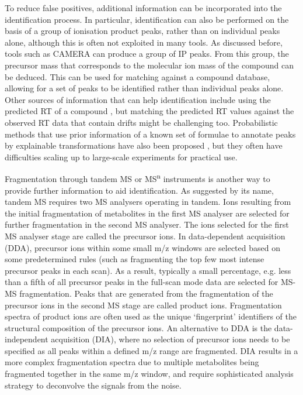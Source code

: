 To reduce false positives, additional information can be incorporated into the identification process. In particular, identification can also be performed on the basis of a group of ionisation product peaks, rather than on individual peaks alone, although this is often not exploited in many tools. As discussed before, tools such as CAMERA \cite{Kuhl2012} can produce a group of IP peaks. From this group, the precursor mass that corresponds to the molecular ion mass of the compound can be deduced. This can be used for matching against a compound database, allowing for a set of peaks to be identified rather than individual peaks alone. Other sources of information that can help identification include using the predicted RT of a compound \cite{Creek2011, Cao2015, Stanstrup2015}, but matching the predicted RT values against the observed RT data that contain drifts might be challenging too. Probabilistic methods that use prior information of a known set of formulae to annotate peaks by explainable transformations have also been proposed \cite{Rogers2009a, Daly2014}, but they often have difficulties scaling up to large-scale experiments for practical use.

Fragmentation through tandem MS or MS\textsuperscript{n} instruments is another way to provide further information to aid identification. As suggested by its name, tandem MS requires two MS analysers operating in tandem. Ions resulting from the initial fragmentation of metabolites in the first MS analyser are selected for further fragmentation in the second MS analyser. The ions selected for the first MS analyser stage are called the precursor ions. In data-dependent acquisition (DDA), precursor ions within some small m/z windows are selected based on some predetermined rules (such as fragmenting the top few most intense precursor peaks in each scan). As a result, typically a small percentage, e.g. less than a fifth of all precursor peaks in the full-scan mode data are selected for MS-MS fragmentation. Peaks that are generated from the fragmentation of the precursor ions in the second MS stage are called product ions. Fragmentation spectra of product ions are often used as the unique `fingerprint' identifiers of the structural composition of the precursor ions. An alternative to DDA is the data-independent acquisition (DIA), where no selection of precursor ions needs to be specified as all peaks within a defined m/z range are fragmented. DIA results in a more complex fragmentation spectra due to multiple metabolites being fragmented together in the same m/z window, and require sophisticated analysis strategy to deconvolve the signals from the noise.


